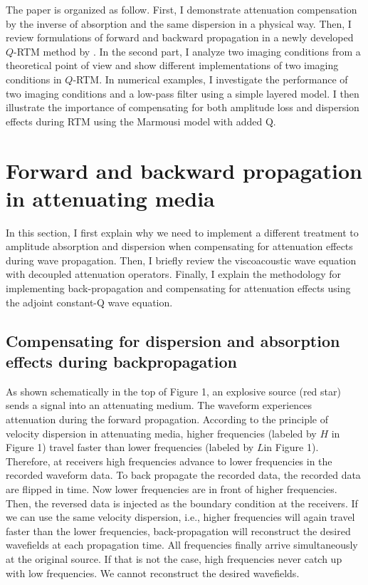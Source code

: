 The paper is organized as follow. First, I demonstrate attenuation compensation by the inverse of absorption and the same dispersion in a physical way. Then, I review formulations of forward and backward propagation in a newly developed $Q$-RTM method by \citet[]{zhu14d}. In the second part, I analyze two imaging conditions from a theoretical point of view and show different implementations of two imaging conditions in $Q$-RTM. In numerical examples, I investigate the performance of two imaging conditions and a low-pass filter using a simple layered model. I then illustrate the importance of compensating for both amplitude loss and dispersion effects during RTM using the Marmousi model with added Q.


\section{Forward and backward propagation in attenuating media}

In this section, I first explain why we need to implement a different treatment to amplitude absorption and dispersion when compensating for attenuation effects during wave propagation. Then, I briefly review the viscoacoustic wave equation with decoupled attenuation operators. Finally, I explain the methodology for implementing back-propagation and compensating for attenuation effects using the adjoint constant-Q wave equation.

\subsection{Compensating for dispersion and absorption effects during backpropagation}

As shown schematically in the top of Figure 1, an explosive source (red star) sends a signal into an attenuating medium. The waveform experiences attenuation during the forward propagation. According to the principle of velocity dispersion in attenuating media, higher frequencies (labeled by $H$ in Figure 1) travel faster than lower frequencies (labeled by $L$in Figure 1). Therefore, at receivers high frequencies advance to lower frequencies in the recorded waveform data. To back propagate the recorded data, the recorded data are flipped in time. Now lower frequencies are in front of higher frequencies. Then, the reversed data is injected as the boundary condition at the receivers. If we can use the same velocity dispersion, i.e., higher frequencies will again travel faster than the lower frequencies, back-propagation will reconstruct the desired wavefields at each propagation time. All frequencies finally arrive simultaneously at the original source. If that is not the case, high frequencies never catch up with low frequencies. We cannot reconstruct the desired wavefields. 

